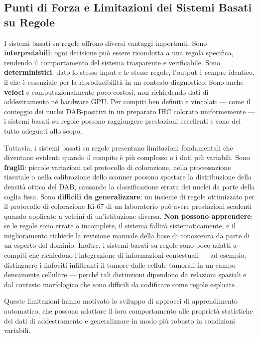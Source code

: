 \subsection{Punti di Forza e Limitazioni dei Sistemi Basati su Regole}

I sistemi basati su regole offrono diversi vantaggi importanti. Sono \textbf{interpretabili}: ogni decisione può essere ricondotta a una regola specifica, rendendo il comportamento del sistema trasparente e verificabile. Sono \textbf{deterministici}: dato lo stesso input e le stesse regole, l'output è sempre identico, il che è essenziale per la riproducibilità in un contesto diagnostico. Sono anche \textbf{veloci} e computazionalmente poco costosi, non richiedendo dati di addestramento né hardware GPU. Per compiti ben definiti e vincolati — come il conteggio dei nuclei DAB-positivi in un preparato IHC colorato uniformemente — i sistemi basati su regole possono raggiungere prestazioni eccellenti e sono del tutto adeguati allo scopo.

Tuttavia, i sistemi basati su regole presentano limitazioni fondamentali che diventano evidenti quando il compito è più complesso o i dati più variabili. Sono \textbf{fragili}: piccole variazioni nel protocollo di colorazione, nella processazione tissutale o nella calibrazione dello scanner possono spostare la distribuzione della densità ottica del DAB, causando la classificazione errata dei nuclei da parte della soglia fissa. Sono \textbf{difficili da generalizzare}: un insieme di regole ottimizzato per il protocollo di colorazione Ki-67 di un laboratorio può avere prestazioni scadenti quando applicato a vetrini di un'istituzione diversa. \textbf{Non possono apprendere}: se le regole sono errate o incomplete, il sistema fallirà sistematicamente, e il miglioramento richiede la revisione manuale della base di conoscenza da parte di un esperto del dominio. Inoltre, i sistemi basati su regole sono poco adatti a compiti che richiedono l'integrazione di informazioni contestuali — ad esempio, distinguere i linfociti infiltranti il tumore dalle cellule tumorali in un campo densamente cellulare — perché tali distinzioni dipendono da relazioni spaziali e dal contesto morfologico che sono difficili da codificare come regole esplicite \cite{rashidi2019}.

Queste limitazioni hanno motivato lo sviluppo di approcci di apprendimento automatico, che possono adattare il loro comportamento alle proprietà statistiche dei dati di addestramento e generalizzare in modo più robusto in condizioni variabili.

